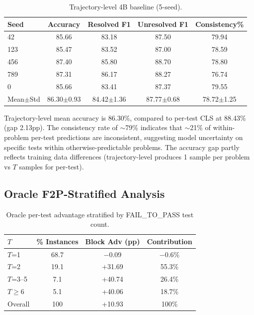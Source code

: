\documentclass[11pt,a4paper]{article}
\begin{document}
\begin{table}[h]
\centering
\caption{Trajectory-level 4B baseline (5-seed).}
\label{tab:traj}
\begin{tabular}{lcccc}
\toprule
Seed & Accuracy & Resolved F1 & Unresolved F1 & Consistency\% \\
\midrule
42  & 85.66 & 83.18 & 87.50 & 79.94 \\
123 & 85.47 & 83.52 & 87.00 & 78.59 \\
456 & 87.40 & 85.80 & 88.70 & 78.80 \\
789 & 87.31 & 86.17 & 88.27 & 76.74 \\
0   & 85.66 & 83.41 & 87.37 & 79.55 \\
\midrule
Mean$\pm$Std & 86.30$\pm$0.93 & 84.42$\pm$1.36 & 87.77$\pm$0.68 & 78.72$\pm$1.25 \\
\bottomrule
\end{tabular}
\end{table}

Trajectory-level mean accuracy is 86.30\%, compared to per-test CLS at 88.43\% (gap 2.13pp). The consistency rate of $\sim$79\% indicates that $\sim$21\% of within-problem per-test predictions are inconsistent, suggesting model uncertainty on specific tests within otherwise-predictable problems. The accuracy gap partly reflects training data differences (trajectory-level produces 1 sample per problem vs $T$ samples for per-test).

\subsection{Oracle F2P-Stratified Analysis}
\label{sec:oracle}

\begin{table}[h]
\centering
\caption{Oracle per-test advantage stratified by FAIL\_TO\_PASS test count.}
\label{tab:oracle}
\begin{tabular}{lccc}
\toprule
$T$ & \% Instances & Block Adv (pp) & Contribution \\
\midrule
$T$=1 & 68.7 & $-$0.09 & $-$0.6\% \\
$T$=2 & 19.1 & +31.69 & 55.3\% \\
$T$=3--5 & 7.1 & +40.74 & 26.4\% \\
$T\geq$6 & 5.1 & +40.06 & 18.7\% \\
\midrule
Overall & 100 & +10.93 & 100\% \\
\bottomrule
\end{tabular}
\end{table}
\end{document}
